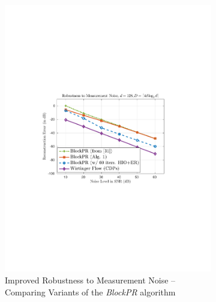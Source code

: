 %
\begin{figure}[hbtp]
\centering
\begin{subfigure}[b]{0.495\textwidth}
\centering
\includegraphics[clip=true, trim = 1.5in 3.5in 1.5in 3.25in,scale=0.610]{pics/fig2a}
\caption{Improved Robustness to Measurement Noise -- Comparing Variants of the {\em BlockPR}
algorithm}
\label{fig:eig_vs_greedy}
\end{subfigure}
\hfill
\begin{subfigure}[b]{0.495\textwidth}
\centering

\end{subfigure}
\end{figure}
